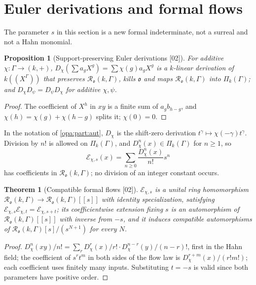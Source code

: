 \documentclass[11pt,oneside]{article}
\numberwithin{equation}{section}
\newtheorem{theorem}{Theorem}[section]
\newtheorem{proposition}[proposition]{Proposition}
\theoremstyle{definition}
\theoremstyle{remark}
\newcommand{\oo}{\mathfrak o}
\newcommand{\EE}{\mathcal E}
\newcommand{\src}[1]{\textup{\textsf{\small[#1]}}}
\begin{document}
\section{Euler derivations and formal flows}\label{opa:par:sec:formal}

The parameter $s$ in this section is a new formal indeterminate, not a surreal and not
a Hahn monomial.

\begin{proposition}[Support-preserving Euler derivations \src{02}]\label{opa:par:prop:Euler}
For additive $\chi:\Gamma\to(k,+)$, $D_\chi(\sum a_gX^g)=\sum\chi(g)a_gX^g$ is a
$k$-linear derivation of $k((X^\Gamma))$ that preserves $\mathcal R_\oo(k,\Gamma)$, kills
$\oo$ and maps $\mathcal R_\oo(k,\Gamma)$ into $\Pi_k(\Gamma)$; and
$D_\chi D_\psi=D_\psi D_\chi$ for additive $\chi,\psi$.
\end{proposition}
\begin{proof}
The coefficient of $X^h$ in $xy$ is a finite sum of $a_gb_{h-g}$, and
$\chi(h)=\chi(g)+\chi(h-g)$ splits it; $\chi(0)=0$.
\end{proof}

In the notation of \cref{opa:part:aut}, $D_\chi$ is the shift-zero derivation
$t^\gamma\mapsto\chi(-\gamma)t^\gamma$. Division by $n!$ is allowed on $\Pi_k(\Gamma)$, and
$D_\chi^n(x)\in\Pi_k(\Gamma)$ for $n\ge1$, so
\begin{equation}\label{opa:par:eq:formalexp}
 \EE_{\chi,s}(x)=\sum_{n\ge0}\frac{D_\chi^n(x)}{n!}s^n
\end{equation}
has coefficients in $\mathcal R_\oo(k,\Gamma)$; no division of an integer constant occurs.

\begin{theorem}[Compatible formal flows \src{02}]\label{opa:par:thm:formal}
$\EE_{\chi,s}$ is a unital ring homomorphism $\mathcal R_\oo(k,\Gamma)\to
\mathcal R_\oo(k,\Gamma)[[s]]$ with identity specialization, satisfying
$\EE_{\chi,s}\EE_{\chi,t}=\EE_{\chi,s+t}$; its coefficientwise extension fixing $s$ is
an automorphism of $\mathcal R_\oo(k,\Gamma)[[s]]$ with inverse from $-s$, and it induces
compatible automorphisms of $\mathcal R_\oo(k,\Gamma)[s]/(s^{N+1})$ for every $N$.
\end{theorem}
\begin{proof}
$D_\chi^n(xy)/n!=\sum_rD_\chi^r(x)/r!\cdot D_\chi^{n-r}(y)/(n-r)!$, first in the Hahn
field; the coefficient of $s^rt^m$ in both sides of the flow law is
$D_\chi^{r+m}(x)/(r!m!)$; each coefficient uses finitely many inputs. Substituting $t=-s$
is valid since both parameters have positive order.
\end{proof}
\end{document}
